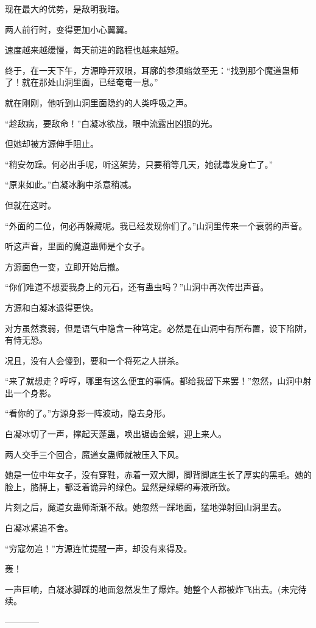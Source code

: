 \begin{this_body}
现在最大的优势，是敌明我暗。

两人前行时，变得更加小心翼翼。

速度越来越缓慢，每天前进的路程也越来越短。

终于，在一天下午，方源睁开双眼，耳廓的参须缩敛至无：“找到那个魔道蛊师了！就在那处山洞里面，已经奄奄一息。”

就在刚刚，他听到山洞里面隐约的人类呼吸之声。

“趁敌病，要敌命！”白凝冰欲战，眼中流露出凶狠的光。

但她却被方源伸手阻止。

“稍安勿躁。何必出手呢，听这架势，只要稍等几天，她就毒发身亡了。”

“原来如此。”白凝冰胸中杀意稍减。

但就在这时。

“外面的二位，何必再躲藏呢。我已经发现你们了。”山洞里传来一个衰弱的声音。

听这声音，里面的魔道蛊师是个女子。

方源面色一变，立即开始后撤。

“你们难道不想要我身上的元石，还有蛊虫吗？”山洞中再次传出声音。

方源和白凝冰退得更快。

对方虽然衰弱，但是语气中隐含一种笃定。必然是在山洞中有所布置，设下陷阱，有恃无恐。

况且，没有人会傻到，要和一个将死之人拼杀。

“来了就想走？哼哼，哪里有这么便宜的事情。都给我留下来罢！”忽然，山洞中射出一个身影。

“看你的了。”方源身影一阵波动，隐去身形。

白凝冰切了一声，撑起天蓬蛊，唤出锯齿金蜈，迎上来人。

两人交手三个回合，魔道女蛊师就被压入下风。

她是一位中年女子，没有穿鞋，赤着一双大脚，脚背脚底生长了厚实的黑毛。她的脸上，胳膊上，都泛着诡异的绿色。显然是绿蟒的毒液所致。

片刻之后，魔道女蛊师渐渐不敌。她忽然一踩地面，猛地弹射回山洞里去。

白凝冰紧追不舍。

“穷寇勿追！”方源连忙提醒一声，却没有来得及。

轰！

一声巨响，白凝冰脚踩的地面忽然发生了爆炸。她整个人都被炸飞出去。(未完待续。

------------

\end{this_body}

